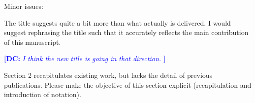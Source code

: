 \documentclass[12pt]{article}
\newcommand{\revtext}{\textsf}
\newcommand{\comment}[3]{\textcolor{#1}{\textbf{[#2: }\textsl{#3}\textbf{]}}}
\newcommand{\dc}[1]{\comment{blue}{DC}{#1}}
\begin{document}
\revtext{Minor issues:}

\revtext{The title suggests quite a bit more than what actually is delivered. I would suggest rephrasing the title such that it accurately reflects the main contribution of this manuscript.}

\dc{I think the new title is going in that direction. } 



\revtext{Section 2 recapitulates existing work, but lacks the detail of previous publications. Please make the objective of this section explicit (recapitulation and introduction of notation).}
\end{document}
